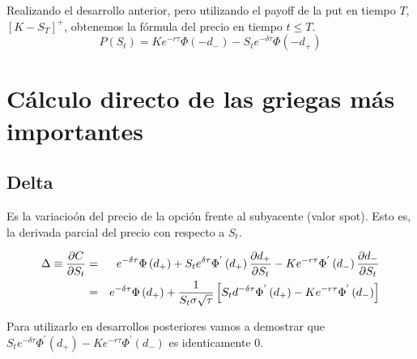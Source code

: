 \documentclass[12pt]{article}
\begin{document}
Realizando el desarrollo anterior, pero utilizando el payoff de la put en tiempo $T$, $\left[K-S_{T}\right]^{+}$, obtenemos
la f\'{o}rmula del precio en tiempo $t\leq T$.
\newline
\begin{equation}
	P\left(S_{t}\right) = Ke^{-r\tau}\Phi\left(-d_{-}\right) - S_{t}e^{-\delta\tau}\Phi\left(-d_{+}\right)
\end{equation}
\newline

\section{C\'{a}lculo directo de las griegas m\'{a}s importantes}
\subsection{Delta}

Es la variacio\'{o}n del precio de la opci\'{o}n frente al subyacente (valor spot). Esto es, la derivada parcial del precio con respecto a 
$S_{t}$.
\newline

\begin{eqnarray}
	\Delta\equiv\frac{\partial C}{\partial S_{t}} & = & e^{-\delta\tau}\Phi\left(d_{+}\right) + 
								S_{t}e^{\-\delta\tau}\Phi^{'}\left(d_{+}\right)
								\frac{\partial d_{+}}{\partial S_{t}} - Ke^{-r\tau}
								\Phi^{'}\left(d_{-}\right)\frac{\partial d_{-}}{\partial S_{t}} 
								\nonumber \\
					& = & e^{-\delta\tau}\Phi\left(d_{+}\right) + 
						\frac{1}{S_{t}\sigma\sqrt{\tau}}\left[S_{t}d^{-\delta\tau}
						\Phi^{'}\left(d_{+}\right)-Ke^{-r\tau}\Phi^{'}\left(d_{-}\right)\right] 
								\nonumber 
\end{eqnarray}
\newline

Para utilizarlo en desarrollos posteriores vamos a demostrar que $S_{t}e^{-\delta\tau}\Phi^{'}\left(d_{+}\right) - 
Ke^{-r\tau}\Phi^{'}\left(d_{-}\right)$ es identicamente $0$.
\newline
\end{document}

